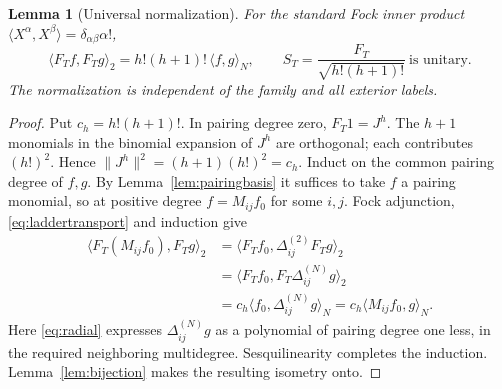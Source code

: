 \documentclass[10pt,a4paper]{article}
\newtheorem{lemma}[theorem]{Lemma}
\begin{document}
\begin{lemma}[Universal normalization]\label{lem:isometry}
For the standard Fock inner product
$\langle X^\alpha,X^\beta\rangle=\delta_{\alpha\beta}\alpha!$,
\begin{equation}\label{eq:scalarisometry}
 \langle F_Tf,F_Tg\rangle_2=h!(h+1)!\,\langle f,g\rangle_N,
 \qquad
 \boxed{S_T=\frac{F_T}{\sqrt{h!(h+1)!}}\ \text{is unitary}.}
\end{equation}
The normalization is independent of the family and all exterior labels.
\end{lemma}
\begin{proof}
Put $c_h=h!(h+1)!$. In pairing degree zero, $F_T1=J^h$.
The $h+1$ monomials in the binomial expansion of $J^h$ are orthogonal;
each contributes $(h!)^2$. Hence $\|J^h\|^2=(h+1)(h!)^2=c_h$.
Induct on the common pairing degree of $f,g$. By
Lemma~\ref{lem:pairingbasis} it suffices to take $f$ a pairing monomial,
so at positive degree $f=M_{ij}f_0$ for some $i,j$.
Fock adjunction, \eqref{eq:laddertransport} and induction give
\begin{align*}
 \langle F_T(M_{ij}f_0),F_Tg\rangle_2
 &=\langle F_Tf_0,\Delta_{ij}^{(2)}F_Tg\rangle_2\\
 &=\langle F_Tf_0,F_T\Delta_{ij}^{(N)}g\rangle_2\\
 &=c_h\langle f_0,\Delta_{ij}^{(N)}g\rangle_N
 =c_h\langle M_{ij}f_0,g\rangle_N.
\end{align*}
Here \eqref{eq:radial} expresses $\Delta_{ij}^{(N)}g$ as a polynomial
of pairing degree one less, in the required neighboring multidegree.
Sesquilinearity completes the induction. Lemma~\ref{lem:bijection} makes the
resulting isometry onto.
\end{proof}
\end{document}
